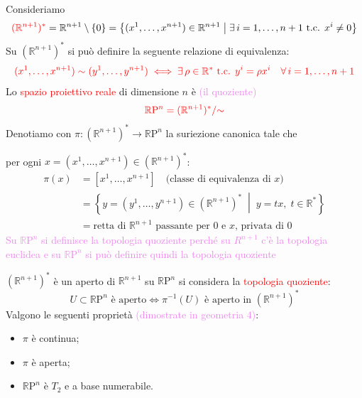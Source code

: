        \begin{definizione}
        \mbox{}

        Consideriamo
        \[
        \textcolor{red}{(\mathbb{R}^{n+1})^*} = \mathbb{R}^{n+1} \setminus \{0\} = \left\{ (x^1, \dots, x^{n+1}) \in \mathbb{R}^{n+1} \;\middle|\; \exists\, i = 1, \dots, n+1 \text{ t.c. } x^i \neq 0 \right\}
        \]
        Su $(\mathbb{R}^{n+1})^*$ si può definire la seguente relazione di equivalenza:
        \[
        \textcolor{red}{(x^1, \dots, x^{n+1}) \sim (y^1, \dots, y^{n+1}) \iff \exists\, \rho \in \mathbb{R}^* \text{ t.c. } y^i = \rho x^i \quad \forall\, i = 1, \dots, n+1}
        \]
        Lo \textcolor{red}{spazio proiettivo reale} di dimensione $n$ è \textcolor{violet}{(il quoziente)}
        \[
        \textcolor{red}{\mathbb{R}\mathrm{P}^n = (\mathbb{R}^{n+1})^* / {\sim}}
        \]
        Denotiamo con $\pi : (\mathbb{R}^{n+1})^* \to \mathbb{R}\mathrm{P}^n$ la suriezione canonica tale che 
        
        per ogni $x = (x^1, \dots, x^{n+1}) \in (\mathbb{R}^{n+1})^*$:
        \begin{align*}
        \pi(x) &= [x^1, \dots, x^{n+1}] \quad \text{(classe di equivalenza di $x$)} \\
        &= \left\{ y = (y^1, \dots, y^{n+1}) \in (\mathbb{R}^{n+1})^* \;\middle|\; y = tx, \; t \in \mathbb{R}^* \right\} \\
        &= \text{retta di $\mathbb{R}^{n+1}$ passante per $0$ e $x$, privata di $0$}
        \end{align*}
        \textcolor{violet}{Su $\mathbb{R}\mathrm{P}^n$ si definisce la topologia quoziente perché su $R^{n+1}$ c'è la topologia euclidea e su $\mathbb{R}\mathrm{P}^n$
        si può definire quindi la topologia quoziente}

        $(\mathbb{R}^{n+1})^*$ è un aperto di $\mathbb{R}^{n+1}$ su $\mathbb{R}\mathrm{P}^n$ si considera la \textcolor{red}{topologia quoziente}:
        \[
        U \subset \mathbb{R}\mathrm{P}^n \text{ è aperto} \iff \pi^{-1}(U) \text{ è aperto in } (\mathbb{R}^{n+1})^*
        \]
        Valgono le seguenti proprietà \textcolor{violet}{(dimostrate in geometria $4$)}:
        \begin{itemize}
            \item $\pi$ è continua;
            \item $\pi$ è aperta;
            \item $\mathbb{R}\mathrm{P}^n$ è $T_2$ e a base numerabile.
        \end{itemize}
        \end{definizione}

